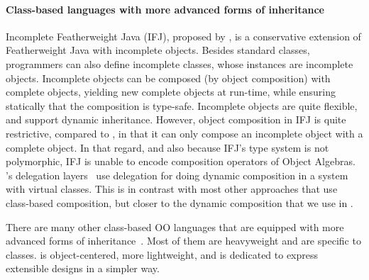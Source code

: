 \paragraph{Class-based languages with more advanced forms of inheritance}

Incomplete Featherweight Java (IFJ), proposed by \citet{bettini2008type}, is a
conservative extension of Featherweight Java with incomplete objects. Besides
standard classes, programmers can also define incomplete classes, whose
instances are incomplete objects. Incomplete objects can be composed (by object
composition) with complete objects, yielding new complete objects at run-time,
while ensuring statically that the composition is type-safe. Incomplete objects
are quite flexible, and support dynamic inheritance. However, object composition
in IFJ is quite restrictive, compared to \name, in that it can only compose an
incomplete object with a complete object. In that regard, and also because IFJ's
type system is not polymorphic, IFJ is unable to encode composition operators of
Object Algebras. \citeauthor{ostermann2002dynamically}'s delegation
layers~\citep{ostermann2002dynamically} use delegation for doing dynamic
composition in a system with virtual classes. This is in contrast with most other
approaches that use class-based composition, but closer to the dynamic
composition that we use in \name.

There are many other class-based OO languages that are equipped with more
advanced forms of
inheritance~\cite{meyer1987eiffel,buchi2000generic,ostermann2001object,kniesel1999type}.
Most of them are heavyweight and are specific to classes. \name is
object-centered, more lightweight, and is dedicated to express extensible
designs in a simpler way.




